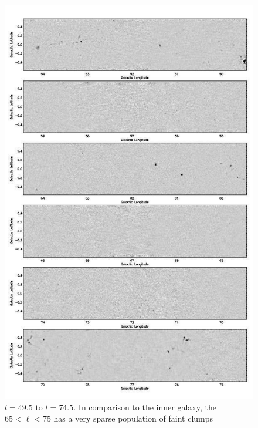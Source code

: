 \documentclass[12pt,preprint]{aastex}
\newcommand{\lon}{\ensuremath{l}}
\begin{document}
\addtocounter{figure}{-1}
\addtocounter{subfig}{1}

\begin{figure}
  \begin{minipage}{6.5in} \begin{center}
    \includegraphics[scale=0.8]{f19c}
    \caption{$\lon=49.5$ to $\lon=74.5$.  In comparison to the inner
    galaxy, the $65 < \ell < 75$ has a very sparse population of faint
    clumps} \end{center} \end{minipage}
\end{figure}

\addtocounter{figure}{-1}
\addtocounter{subfig}{1}
\end{document}
